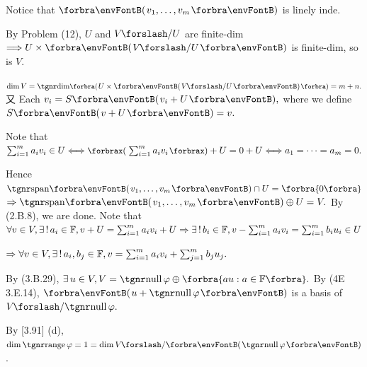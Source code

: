Notice that $\Par{v_1,\dots,v_m}$ is linely inde.\par\quad
By Problem (12), $U$ and $V\mySlash U$ are finite-dim $\Longrightarrow U\times\Par{V\mySlash U}$ is finite-dim, so is $V$.\par\quad
$\dim V=\Dim\BigPar{U\times\Par{V\mySlash U}}=m+n.$ 又 Each $v_i=S\Par{v_i+U},$ where we define $S\Par{v+U}=v.$\par\quad
Note that $\sum_{i=1}^m a_i v_i\in U\Longleftrightarrow\XPar{\sum_{i=1}^m a_i v_i}+U=0+U\Longleftrightarrow a_1=\dots=a_m=0.$\vspace{4pt}\par\quad
Hence $\Span{v_1,\dots,v_m}\cap U=\zeroSubs$
$\Rightarrow\Span{v_1,\dots,v_m}\oplus U=V.$ By (2.B.8), we are done.\PfEnd\vspace{8pt}\quad
\Or Note that $\forall v\in V,\exists\,!\,a_i\in{\mathbb{F}},v+U=\sum_{i=1}^m a_i v_i+U\Rightarrow\exists\,!\,b_i\in{\mathbb{F}},v-\sum_{i=1}^m a_i v_i=\sum_{i=1}^m b_i u_i\in U$\vspace{4pt}\par\quad
{} $\Rightarrow \forall v\in V,\exists\,!\,a_i,b_j\in{\mathbb{F}},v=\sum_{i=1}^m a_i v_i+\sum_{j=1}^m b_j u_j.$\PfEnd
\SepLine

\par\quad
By (3.B.29), $\exists\,u\in V,V=\null\varphi\oplus\Bra{au:a\in\Fbb}.$ By (4E 3.E.14), $\Par{u+\null\varphi}$ is a basis of $V\mySlash \null\varphi.$\par\quad
\Or By [3.91] (d), $\dim\range\varphi=1=\dim V\mySlash \Par{\null \varphi}$.\PfEnd
\SepLine

